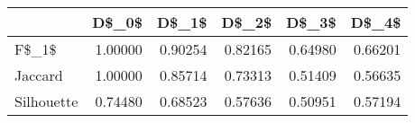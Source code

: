 \begin{table}
\centering
\caption{}
\label{}
\begin{tabular}{lrrrrr}
\toprule
{} &   D\$\_0\$ &   D\$\_1\$ &   D\$\_2\$ &   D\$\_3\$ &   D\$\_4\$ \\
\midrule
F\$\_1\$      & 1.00000 & 0.90254 & 0.82165 & 0.64980 & 0.66201 \\
Jaccard    & 1.00000 & 0.85714 & 0.73313 & 0.51409 & 0.56635 \\
Silhouette & 0.74480 & 0.68523 & 0.57636 & 0.50951 & 0.57194 \\
\bottomrule
\end{tabular}
\end{table}
